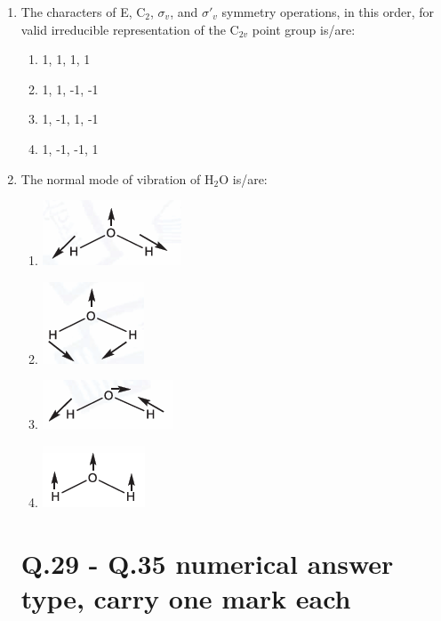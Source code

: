 \documentclass[journal,12pt,onecolumn]{IEEEtran}
\begin{document}
\begin{enumerate}
    \item The characters of E, C$_2$, $\sigma_v$, and $\sigma'_v$ symmetry operations, in this order, for valid irreducible representation of the C$_{2v}$ point group is/are:
    \begin{multicols}{2}
    \begin{enumerate}
        \item 1, 1, 1, 1
        \item 1, 1, -1, -1
        \item 1, -1, 1, -1
        \item 1, -1, -1, 1
    \end{enumerate}
    \end{multicols}
    \hfill{}

    \item The normal mode of vibration of H$_2$O is/are:
    
    \begin{enumerate}
        \item \includegraphics[width=0.25\columnwidth]{figs/q28a.png}
        \item \includegraphics[width=0.25\columnwidth]{figs/q28b.png}
        \item \includegraphics[width=0.25\columnwidth]{figs/q28c.png}
        \item \includegraphics[width=0.25\columnwidth]{figs/q28d.png}
    \end{enumerate}
    
    \hfill{}
\section*{Q.29 - Q.35 numerical answer type, carry one mark each}


\end{enumerate}
\end{document}
